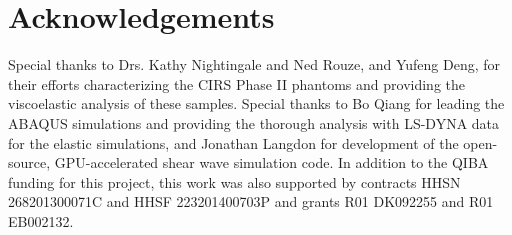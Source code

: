 \section{Acknowledgements}
Special thanks to Drs. Kathy Nightingale and Ned Rouze, and Yufeng Deng, for
their efforts characterizing the CIRS Phase II phantoms and providing the
viscoelastic analysis of these samples.  Special thanks to Bo Qiang for leading
the ABAQUS simulations and providing the thorough analysis with LS-DYNA data
for the elastic simulations, and Jonathan Langdon for development of the
open-source, GPU-accelerated shear wave simulation code.  In addition to the
QIBA funding for this project, this work was also supported by contracts HHSN
268201300071C and HHSF 223201400703P and grants R01 DK092255 and R01 EB002132.
